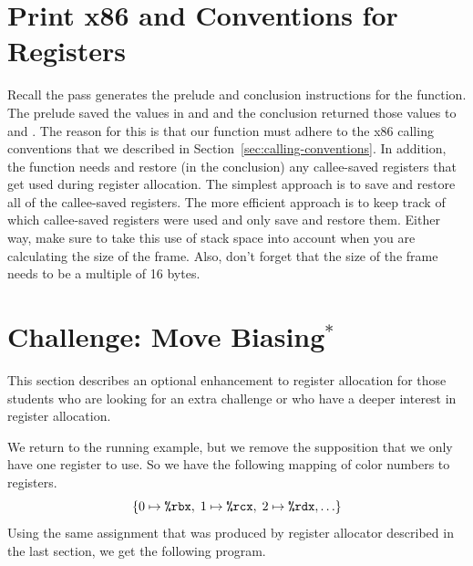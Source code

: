 \documentclass[11pt]{book}
\begin{document}
\section{Print x86 and Conventions for Registers}
\label{sec:print-x86-reg-alloc}

Recall the  pass generates the prelude and
conclusion instructions for the  function.
%
The prelude saved the values in  and  and the
conclusion returned those values to  and .  The
reason for this is that our  function must adhere to the
x86 calling conventions that we described in
Section~\ref{sec:calling-conventions}. In addition, the 
function needs and restore (in the conclusion) any callee-saved
registers that get used during register allocation. The simplest
approach is to save and restore all of the callee-saved registers. The
more efficient approach is to keep track of which callee-saved
registers were used and only save and restore them. Either way, make
sure to take this use of stack space into account when you are
calculating the size of the frame. Also, don't forget that the size of
the frame needs to be a multiple of 16 bytes.

\section{Challenge: Move Biasing$^{*}$}
\label{sec:move-biasing}

This section describes an optional enhancement to register allocation
for those students who are looking for an extra challenge or who have
a deeper interest in register allocation.

We return to the running example, but we remove the supposition that
we only have one register to use. So we have the following mapping of
color numbers to registers.
\[
  \{ 0 \mapsto \texttt{\%rbx}, \; 1 \mapsto \texttt{\%rcx}, \; 2 \mapsto \texttt{\%rdx}, \ldots \}
\]
Using the same assignment that was produced by register allocator
described in the last section, we get the following program.
\end{document}
